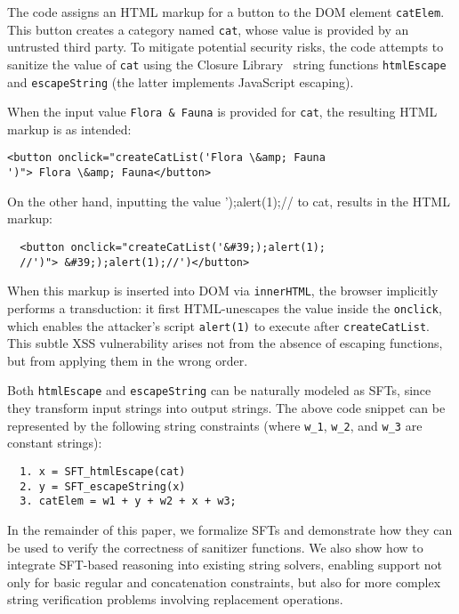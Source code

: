 The code assigns an HTML markup for a button to the DOM element \texttt{catElem}. This button creates a category named \texttt{cat}, whose value is provided by an untrusted third party. To mitigate potential security risks, the code attempts to sanitize the value of \texttt{cat} using the Closure Library~\cite{google-closure-library} string functions \texttt{htmlEscape} and \texttt{escapeString} (the latter implements JavaScript escaping). 

When the input value \texttt{Flora \& Fauna} is provided for \texttt{cat}, the resulting HTML markup is as intended:
\begin{verbatim}
<button onclick="createCatList('Flora \&amp; Fauna
')"> Flora \&amp; Fauna</button>
\end{verbatim}
On the other hand, inputting the value ');alert(1);// to cat,
results in the HTML markup:
\begin{verbatim}
  <button onclick="createCatList('&#39;);alert(1);
  //')"> &#39;);alert(1);//')</button>
\end{verbatim}

When this markup is inserted into DOM via \texttt{innerHTML}, the browser implicitly performs a transduction: it first HTML-unescapes the value inside the \texttt{onclick}, which enables the attacker’s script \texttt{alert(1)} to execute after \texttt{createCatList}. This subtle XSS vulnerability arises not from the absence of escaping functions, but from applying them in the wrong order.

Both \texttt{htmlEscape} and \texttt{escapeString} can be naturally modeled as SFTs, since they transform input strings into output strings. The above code snippet can be represented by the following string constraints (where \texttt{w\_1},
\texttt{w\_2}, and \texttt{w\_3} are constant strings):

\begin{verbatim}
  1. x = SFT_htmlEscape(cat)
  2. y = SFT_escapeString(x)
  3. catElem = w1 + y + w2 + x + w3;
\end{verbatim}

In the remainder of this paper, we formalize SFTs and demonstrate how they can be used to verify the correctness of sanitizer functions. We also show how to integrate SFT-based reasoning into existing string solvers, enabling support not only for basic regular and concatenation constraints, but also for more complex string verification problems involving replacement operations.





